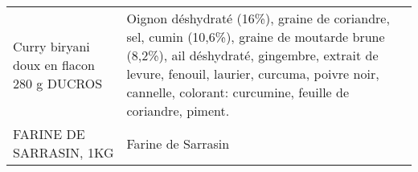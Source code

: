\begin{longtable}{p{5cm}p{10cm}}
                                                                Curry biryani doux en flacon 280 g DUCROS &                                                                                                                                                                                                                                                                                                                                                                                                                                                                                                                                                                                                                                                                                                                                                                                    Oignon déshydraté (16\%), graine de coriandre, sel, cumin (10,6\%), graine de moutarde brune (8,2\%), ail déshydraté, gingembre, extrait de levure, fenouil, laurier, curcuma, poivre noir, cannelle, colorant: curcumine, feuille de coriandre, piment. \\
                                                                                  FARINE DE SARRASIN, 1KG &                                                                                                                                                                                                                                                                                                                                                                                                                                                                                                                                                                                                                                                                                                                                                                                                                                                                                                                                                                                                                       Farine de Sarrasin \\

\end{longtable}
